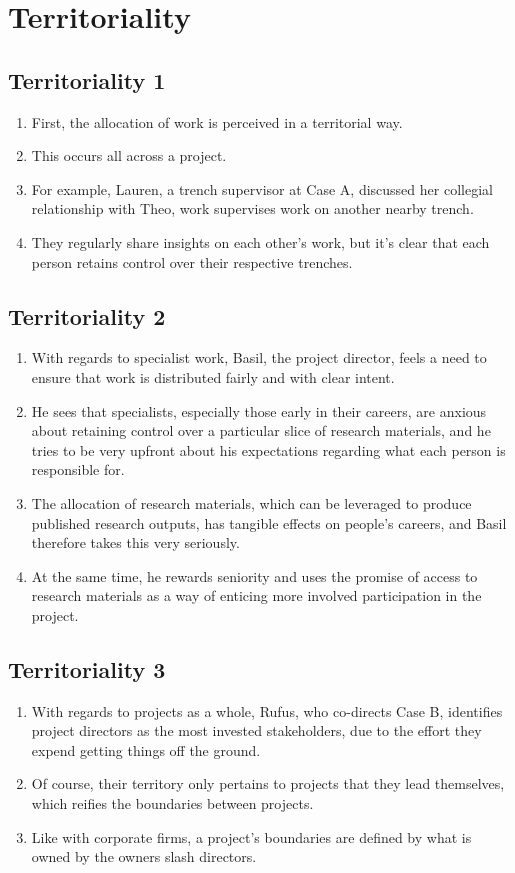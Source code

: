 \documentclass{article}
\begin{document}
\section{Territoriality}
\subsection{Territoriality 1}
\begin{enumerate}
  \item First, the allocation of work is perceived in a territorial way.
  \item This occurs all across a project.
  \item For example, Lauren, a trench supervisor at Case A, discussed her collegial relationship with Theo, work supervises work on another nearby trench.
  \item They regularly share insights on each other's work, but it's clear that each person retains control over their respective trenches.
  
\end{enumerate}

\subsection{Territoriality 2}
\begin{enumerate}
  \item With regards to specialist work, Basil, the project director, feels a need to ensure that work is distributed fairly and with clear intent.
  \item He sees that specialists, especially those early in their careers, are anxious about retaining control over a particular slice of research materials, and he tries to be very upfront about his expectations regarding what each person is responsible for.
  \item The allocation of research materials, which can be leveraged to produce published research outputs, has tangible effects on people's careers, and Basil therefore takes this very seriously.
  \item At the same time, he rewards seniority and uses the promise of access to research materials as a way of enticing more involved participation in the project.
  
\end{enumerate}
  
\subsection{Territoriality 3}
\begin{enumerate}
  \item With regards to projects as a whole, Rufus, who co-directs Case B, identifies project directors as the most invested stakeholders, due to the effort they expend getting things off the ground.
  \item Of course, their territory only pertains to projects that they lead themselves, which reifies the boundaries between projects.
  \item Like with corporate firms, a project's boundaries are defined by what is owned by the owners slash directors.
\end{enumerate}
  
\end{document}
